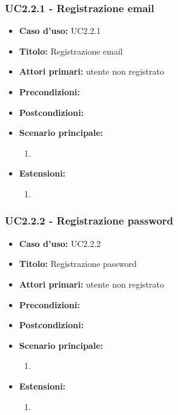 \documentclass[casi-duso]{subfiles}
\begin{document}
\subsubsection{UC2.2.1 - Registrazione email}
\label{subsub:uc2.2.1utente}
\begin{itemize}
  \item \textbf{Caso d’uso:} UC2.2.1 
  \item \textbf{Titolo:} Registrazione email
  \item \textbf{Attori primari:} utente non registrato
  \item \textbf{Precondizioni:} 
  \item \textbf{Postcondizioni:}  
  \item \textbf{Scenario principale:} 
  \begin{enumerate}
    \item 
  \end{enumerate}
  \item \textbf{Estensioni:} 
  \begin{enumerate}
    \item 
  \end{enumerate}     
\end{itemize}

\subsubsection{UC2.2.2 - Registrazione password}
\label{subsub:uc2.2.2utente}
\begin{itemize}
  \item \textbf{Caso d’uso:} UC2.2.2 
  \item \textbf{Titolo:} Registrazione password
  \item \textbf{Attori primari:} utente non registrato
  \item \textbf{Precondizioni:} 
  \item \textbf{Postcondizioni:}  
  \item \textbf{Scenario principale:} 
  \begin{enumerate}
    \item 
  \end{enumerate}
  \item \textbf{Estensioni:} 
  \begin{enumerate}
    \item 
  \end{enumerate}     
\end{itemize}
\end{document}
